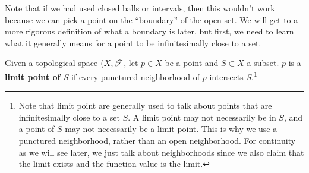     Note that if we had used closed balls or intervals, then this wouldn't work because we can pick a point on the ``boundary'' of the open set. We will get to a more rigorous definition of what a boundary is later, but first, we need to learn what it generally means for a point to be infinitesimally close to a set. 

    \begin{definition}
      Given a topological space $(X, \T$, let $p \in X$ be a point and $S \subset X$ a subset. $p$ is a \textbf{limit point of $S$} if every punctured neighborhood of $p$ intersects $S$.\footnote{Note that limit point are generally used to talk about points that are infinitesimally close to a set $S$. A limit point may not necessarily be in $S$, and a point of $S$ may not necessarily be a limit point. This is why we use a punctured neighborhood, rather than an open neighborhood. For continuity as we will see later, we just talk about neighborhoods since we also claim that the limit exists and the function value is the limit.} 
    \end{definition}

